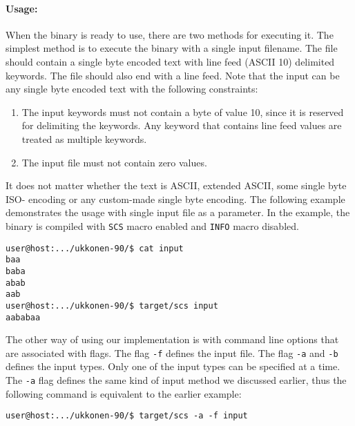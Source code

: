 \documentclass[english,twoside,censored,csm,algorithms-track-2020]{HYthesisML}
\theoremstyle{plain}
\theoremstyle{definition}
\begin{document}
\paragraph{Usage:}
When the binary is ready to use, there are two methods for executing it. The simplest method is to
execute the binary with a single input filename. The file should contain a single byte encoded text with
line feed (ASCII 10) delimited keywords. The file should also end with a line feed. Note that the input
can be any single byte encoded text with the following constraints:

\begin{enumerate}
\item The input keywords must not contain a byte of value 10, since it is reserved for delimiting the
  keywords. Any keyword that contains line feed values are treated as multiple
  keywords.
\item The input file must not contain zero values.
\end{enumerate}

It does not matter whether the text is ASCII, extended ASCII, some single byte ISO- encoding or any
custom-made single byte encoding. The following example demonstrates the usage with single input
file as a parameter. In the example, the binary is compiled with \texttt{SCS} macro enabled and
\texttt{INFO} macro disabled.

\begin{verbatim}
user@host:.../ukkonen-90/$ cat input
baa
baba
abab
aab
user@host:.../ukkonen-90/$ target/scs input
aababaa
\end{verbatim}

The other way of using our implementation is with command line options that are associated with
flags. The flag \texttt{-f} defines the input file. The flag \texttt{-a} and \texttt{-b} defines
the input types. Only one of the
input types can be specified at a time. The \texttt{-a} flag defines the same kind of input method
we discussed earlier, thus the following command is equivalent to the earlier example:

\begin{verbatim}
user@host:.../ukkonen-90/$ target/scs -a -f input
\end{verbatim}
\end{document}
